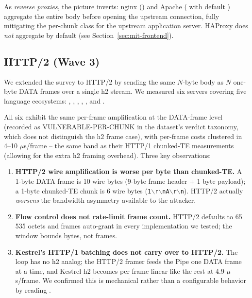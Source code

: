 As \emph{reverse proxies}, the picture inverts: nginx
() and Apache
( with default ) aggregate the entire body before opening the upstream
connection, fully mitigating the per-chunk class for the upstream
application server. HAProxy does \emph{not} aggregate by default
(see Section~\ref{sec:mit-frontend}).

\subsection{HTTP/2 (Wave 3)}
\label{sec:pf-h2}

We extended the survey to HTTP/2 by sending the same
$N$-byte body as $N$ one-byte DATA frames over a single h2 stream.
We measured six servers covering five language ecosystems:
, , ,
, , and .

All six exhibit the same per-frame amplification at the DATA-frame
level (recorded as \textsc{VULNERABLE-PER-CHUNK} in the dataset's
verdict taxonomy, which does not distinguish the h2 frame case),
with per-frame costs clustered in 4--10 \(\mu\)s/frame -- the same
band as their HTTP/1 chunked-TE measurements (allowing for the
extra h2 framing overhead). Three key observations:

\begin{enumerate}
  \item \textbf{HTTP/2 wire amplification is worse per byte than
    chunked-TE.} A 1-byte DATA frame is 10 wire bytes
    (9-byte frame header + 1 byte payload); a 1-byte chunked-TE
    chunk is 6 wire bytes (\texttt{1$\backslash$r$\backslash$nA$\backslash$r$\backslash$n}).
    HTTP/2 actually \emph{worsens} the bandwidth asymmetry
    available to the attacker.
  \item \textbf{Flow control does not rate-limit frame count.}
    HTTP/2  defaults to
    65 535 octets and  frames auto-grant
    in every implementation we tested; the window bounds bytes,
    not frames.
  \item \textbf{Kestrel's HTTP/1 batching does not carry over to
    HTTP/2.} The 
    loop has no h2 analog; the HTTP/2 framer feeds the Pipe one
    DATA frame at a time, and Kestrel-h2 becomes per-frame
    linear like the rest at 4.9 \(\mu\)s/frame. We confirmed this
    is mechanical rather than a configurable behavior by reading
    .
\end{enumerate}

